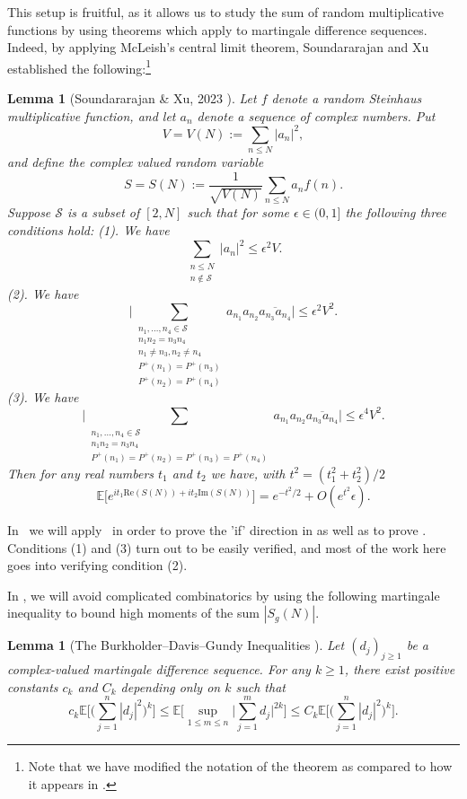 \documentclass[12pt]{amsart}
\renewcommand{\le}{\leqslant}
\renewcommand{\leq}{\leqslant}
\renewcommand{\ge}{\geqslant}
\numberwithin{equation}{section}
\theoremstyle{plain}
\newtheorem{lem}[thm]{Lemma}
\theoremstyle{definition}
\newcommand{\E}{\mathbb{E}}
\newcommand{\CS}{\mathcal{S}}
\renewcommand{\Re}{\mathrm{Re}}
\renewcommand{\Im}{\mathrm{Im}}
\begin{document}
	
	This setup is fruitful, as it allows us to study the sum of random multiplicative functions by using theorems which apply to martingale difference sequences. Indeed, by applying McLeish's central limit theorem, Soundararajan and Xu established the following:\footnote{Note that we have modified the notation of the theorem as compared to how it appears in \cite{sound-xu-CLT}.}
	\begin{lem}[{Soundararajan \& Xu, 2023 \cite[Theorem 3.1]{sound-xu-CLT}}]\label{thm:sound-xu 3.1}
		Let $f$ denote a random Steinhaus multiplicative function, and let $a_n$ denote a sequence of complex numbers. Put
		$$V=V(N) := \sum_{n \leq N}|a_n|^2,$$
		and define the complex valued random variable 
		$$S=S(N):= \frac{1}{\sqrt{V(N)}}\sum_{n \leq N}a_n f(n).$$
		Suppose $\CS$ is a subset of $[2,N]$ such that for some $ \epsilon \in (0,1]$ the following three conditions hold:
		\noindent(1). We have
		$$\sum_{\substack{n \leq N \\ n \not \in \CS}}|a_n|^2 \leq \epsilon^2 V.$$
		(2). We have
		$$\bigg|\sum_{\substack{n_1,\dots,n_4 \in \CS \\ n_1n_2=n_3n_4 \\ n_1 \ne n_3,n_2 \ne n_4 \\ P^+(n_1)=P^+(n_3) \\ P^+(n_2) = P^+(n_4)}} a_{n_1}a_{n_2} \overline{a_{n_3}a_{n_4}}\bigg| \leq \epsilon^2 V^2.$$
		(3). We have 
		$$\bigg|\sum_{\substack{n_1,\dots,n_4 \in \CS \\ n_1n_2=n_3n_4 \\ P^+(n_1)=P^+(n_2) = P^+(n_3) = P^+(n_4)}}a_{n_1}a_{n_2} \overline{a_{n_3}a_{n_4}}\bigg| \leq \epsilon^4 V^2.$$
		Then for any real numbers $t_1$ and $t_2$ we have, with $t^2 = (t_1^2+t_2^2)/2$
		$$\E\big[e^{it_1 \Re(S(N))+it_2\Im(S(N))}\big] = e^{-t^2/2} +O(e^{t^2}\epsilon).$$
	\end{lem}
	In ~we will apply ~in order to prove the 'if' direction in  as well as to prove . Conditions (1) and (3) turn out to be easily verified, and most of the work here goes into verifying condition (2).
	
	In , we will avoid complicated combinatorics by using the following martingale inequality to bound high moments of the sum $|S_g(N)|$. 
	
	\begin{lem}[The Burkholder--Davis--Gundy Inequalities \cite{burkholder1972integral}]\label{thm:BDG}
		Let $(d_j)_{j \ge 1}$ be a complex-valued martingale difference sequence. For any $k \ge 1$, there exist positive constants $c_k$ and $C_k$ depending only on $k$ such that
		\[
		c_k \E\bigg[ \bigg( \sum_{j=1}^n |d_j|^2 \bigg)^k \bigg] \le \E\bigg[ \sup_{1 \le m \le n} \bigg| \sum_{j=1}^m d_j \bigg|^{2k} \bigg] \le C_k \E\bigg[ \bigg( \sum_{j=1}^n |d_j|^2 \bigg)^k \bigg].
		\]
	\end{lem}
	
\end{document}
